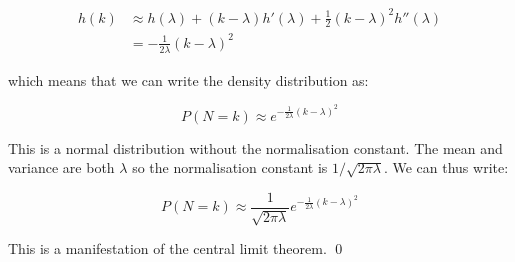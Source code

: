 \documentclass[12pt]{article}
\begin{document}
\begin{equation}
    \begin{split}
        h(k) &\approx h(\lambda) + (k - \lambda) h'(\lambda) + \frac{1}{2} (k - \lambda)^{2} h''(\lambda) \\
        &= -\frac{1}{2\lambda} (k - \lambda)^{2}
    \end{split}
\end{equation}

which means that we can write the density distribution as:

\begin{equation}
    P(N = k) \approx e^{-\frac{1}{2\lambda} (k - \lambda)^{2}}
\end{equation}

This is a normal distribution without the normalisation constant. The mean and variance are both $\lambda$ so the normalisation constant is $1/\sqrt{2\pi\lambda}$. We can thus write:

\begin{equation}
    P(N = k) \approx \frac{1}{\sqrt{2\pi\lambda}} e^{-\frac{1}{2\lambda} (k - \lambda)^{2}}
\end{equation}

This is a manifestation of the central limit theorem.
\qed
\end{document}
